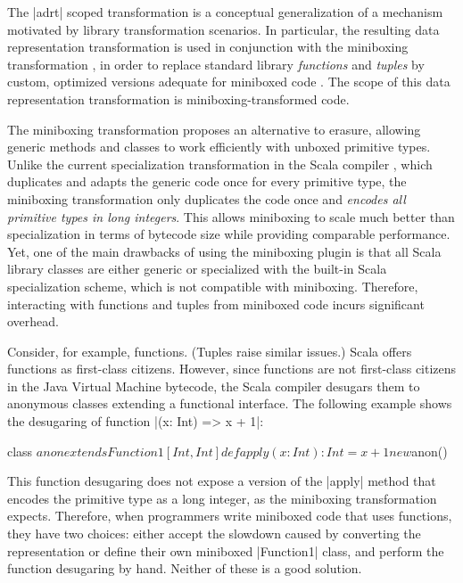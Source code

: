 The |adrt| scoped transformation is a conceptual generalization of a mechanism
motivated by library transformation scenarios. In particular, the
resulting data representation transformation is used in conjunction
with the miniboxing transformation \cite{miniboxing-www, miniboxing},
in order to replace standard library \emph{functions} and \emph{tuples}
by custom, optimized versions adequate for miniboxed code \cite{miniboxing-pppj}.
The scope of this data representation transformation is miniboxing-transformed code.

The miniboxing transformation \cite{miniboxing} proposes an alternative to erasure, allowing generic methods and classes to work efficiently with unboxed primitive types. Unlike the current specialization transformation in the Scala compiler \cite{iuli-thesis}, which duplicates and adapts the generic code once for every primitive type, the miniboxing transformation only duplicates the code once and \emph{encodes all primitive types in long integers}. This allows miniboxing to scale much better than specialization \cite{miniboxing-linkedlist} in terms of bytecode size while providing comparable performance. Yet, one of the main drawbacks of using the miniboxing plugin is that all Scala library classes are either generic or specialized with the built-in Scala specialization scheme, which is not compatible with miniboxing. Therefore, interacting with functions and tuples from miniboxed code incurs significant overhead.

Consider, for example, functions. (Tuples raise similar issues.) Scala offers functions as first-class citizens. However, since functions are not first-class citizens in the Java Virtual Machine bytecode, the Scala compiler desugars them to anonymous classes extending a functional interface. The following example shows the desugaring of function |(x: Int) => x + 1|:

\begin{lstlisting-nobreak}
class $anon extends Function1[Int, Int] {
  def apply(x: Int): Int = x + 1
}
new $anon()
\end{lstlisting-nobreak}

This function desugaring does not expose a version of the |apply| method that encodes the primitive type as a long integer, as the miniboxing transformation expects. Therefore, when programmers write miniboxed code that uses functions, they have two choices: either accept the slowdown caused by converting the representation or define their own miniboxed |Function1| class, and perform the function desugaring by hand. Neither of these is a good solution.


